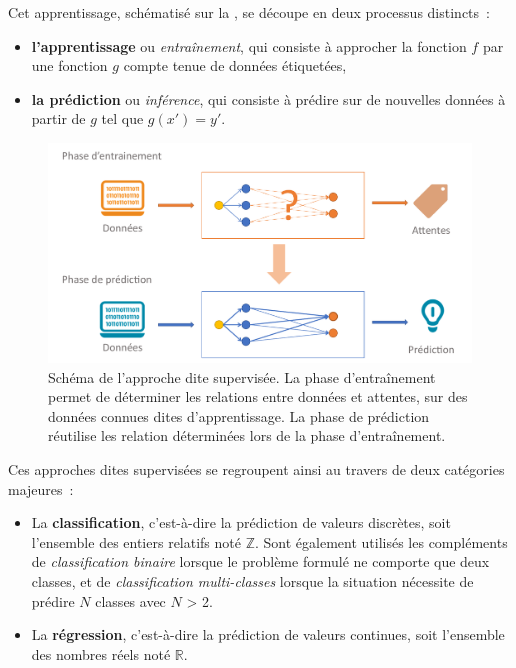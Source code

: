 Cet apprentissage, schématisé sur la , se découpe en deux processus distincts~:
\begin{itemize}
    \item \textbf{l’apprentissage} ou \textit{entraînement}, qui consiste à approcher la fonction $f$ par une fonction $g$ compte tenue de données étiquetées,
    \item \textbf{la prédiction} ou \textit{inférence}, qui consiste à prédire sur de nouvelles données à partir de $g$ tel que $g(x') = y'$.
\end{itemize}\par

\begin{figure}[H]
    \centering
    \includegraphics[width=0.8\linewidth]{contents/chapter_3/resources/scheme_supervised_classification.pdf}
    \caption{Schéma de l’approche dite supervisée. La phase d'entraînement permet de déterminer les relations entre données et attentes, sur des données connues dites d'apprentissage. La phase de prédiction réutilise les relation déterminées lors de la phase d'entraînement. }
    \label{fig:scheme_supervised_classification}
\end{figure}

Ces approches dites supervisées se regroupent ainsi au travers de deux catégories majeures~:
\begin{itemize}
    \item La \textbf{classification}, c’est-à-dire la prédiction de valeurs discrètes, soit l’ensemble des entiers relatifs noté $\pmb{\mathbb{Z}}$. Sont également utilisés les compléments de \textit{classification binaire} lorsque le problème formulé ne comporte que deux classes, et de \textit{classification multi-classes} lorsque la situation nécessite de prédire $N$ classes avec $N$ > 2.
    \item La \textbf{régression}, c’est-à-dire la prédiction de valeurs continues, soit l’ensemble des nombres réels noté $\pmb{\mathbb{R}}$.
\end{itemize}\par

